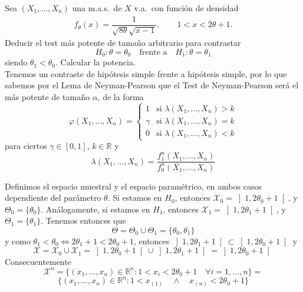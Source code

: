 \documentclass[12pt]{article}
\newcommand{\R}{\mathbb{R}}
\newcommand{\X}{\mathcal{X}}
\begin{document}
    \begin{ejercicio}
        Sea $(X_1,\dots,X_n)$ una m.a.s.\ de $X$ v.a.\ con función de densidad
        \begin{gather}
            f_\theta(x)=\dfrac{1}{\sqrt{8\theta}\sqrt{x-1}}, \qquad 1<x<2\theta+1.
            \tag{3}
        \end{gather}
        Deducir el test más potente de tamaño arbitrario para contrastar
        $$H_0:\theta=\theta_0 \quad \text{frente a} \quad H_1:\theta=\theta_1$$
        siendo $\theta_1<\theta_0$. Calcular la potencia. \\

        Tenemos un contraste de hipótesis simple frente a hipótesis simple, por lo que sabemos por el Lema de Neyman-Pearson que el 
        Test de Neyman-Pearson será el más potente de tamaño $\alpha$, de la forma
        $$\varphi(X_1, \ldots, X_n) = \begin{cases}
            1 &\text{si } \lambda(X_1, \ldots, X_n) > k \\
            \gamma &\text{si } \lambda(X_1, \ldots, X_n) = k \\
            0 &\text{si } \lambda(X_1, \ldots, X_n) < k
        \end{cases}$$
        para ciertos $\gamma \in [0,1]$, $k \in \R$ y 
        $$\lambda(X_1, \ldots, X_n) = \dfrac{f_1^n(X_1, \ldots, X_n)}{f_0^n(X_1, \ldots, X_n)}$$

        Definimos el espacio muestral y el espacio paramétrico, en ambos casos dependiente del parámetro
        $\theta$. Si estamos en $H_0$, entonces $\X_0 = \left]1, 2\theta_0 + 1 \right[$, y $\Theta_0 = 
        \{\theta_0\}$. Análogamente, si estamos en $H_1$, entonces $\X_1 = \left]1, 2\theta_1 + 1 \right[$, y $\Theta_1 = 
        \{\theta_1\}$. Tenemos entonces que $$\Theta = \Theta_0 \cup \Theta_1 = \{\theta_0, \theta_1\}$$ y como
        $\theta_1 < \theta_0 \iff 2\theta_1 + 1 < 2\theta_0 + 1$, entonces $\left]1, 2\theta_1 + 1 \right[ \subset \left]1, 2\theta_0 + 1 \right[$ y
        $$\X = \X_0 \cup \X_1 = \left]1, 2\theta_0 + 1 \right[ \cup \left]1, 2\theta_1 + 1 \right[ = \left]1, 2\theta_0 + 1 \right[$$
        Consecuentemente $$\X^n = \{(x_1, \ldots, x_n) \in \R^n : 1 < x_i < 2\theta_0 + 1 \quad \forall i = 1, \ldots, n\} = $$
        $$\{(x_1, \ldots, x_n) \in \R^n : 1 < x_{(1)} \quad \land \quad x_{(n)} < 2\theta_0 + 1\}$$


\end{ejercicio}
\end{document}
